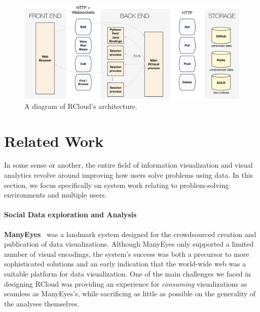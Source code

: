 \begin{figure}
  \centering
\includegraphics[width=.75\linewidth]{fig/system/system.pdf}
\caption{\label{fig:system}A diagram of RCloud's architecture. }
\end{figure}

\section{Related Work\label{sec:related}}

In some sense or another, the entire field of information
visualization and visual analytics revolve around improving how users
solve problems using data. In this section, we focus specifically on
system work relating to problem-solving environments and multiple users.

\paragraph*{Social Data exploration and Analysis}
{\bf ManyEyes}~\cite{Viegas:2007:MAS} was a landmark system designed
for the crowdsourced creation and publication of data
visualizations. Although ManyEyes only supported a limited number of
visual encodings, the system's success was both a precursor to more
sophisticated solutions and an early indication that the world-wide
web was a suitable platform for data visualization. One of the main
challenges we faced in designing RCloud was providing an experience
for \emph{consuming} visualizations as seamless as ManyEyes's, while
sacrificing as little as possible on the generality of the analyses
themselves.

